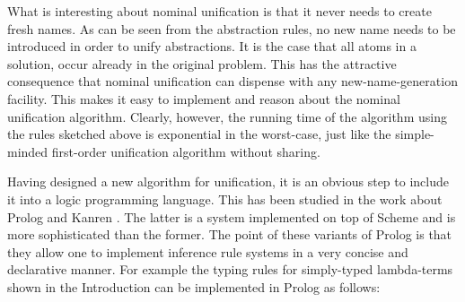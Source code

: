 \begin{isabellebody}
\begin{isamarkuptext}
  \begin{center}
  \end{center}

  \noindent
  What is interesting about nominal unification is that it never needs to
  create fresh names. As can be seen from the abstraction rules, no new name needs
  to be introduced in order to unify abstractions. It is the case that all atoms
  in a solution, occur already in the original problem. This has the attractive 
  consequence that nominal unification can dispense with any new-name-generation
  facility. This makes it easy to implement and reason about the nominal
  unification algorithm. Clearly, however, the running time of the algorithm using the
  rules sketched above is exponential in the worst-case, just like the
  simple-minded first-order unification algorithm without sharing.\end{isamarkuptext}\isamarkuptrue {}
\isamarkuptrue \begin{isamarkuptext}Having designed a new algorithm for unification, it is an obvious step to include it into 
  a logic programming language. This has been studied in the work about 
  Prolog \cite{CheneyUrban04} and
  Kanren \cite{ByrdFriedman07}. The latter is a system implemented on top of
  Scheme and is more sophisticated than the former.
  The point of these variants of Prolog is that
  they allow one to implement inference rule systems in a very concise and declarative
  manner. For example the typing rules for simply-typed lambda-terms shown in the
  Introduction can be implemented
  in Prolog as follows:


\end{isamarkuptext}
\end{isabellebody}
